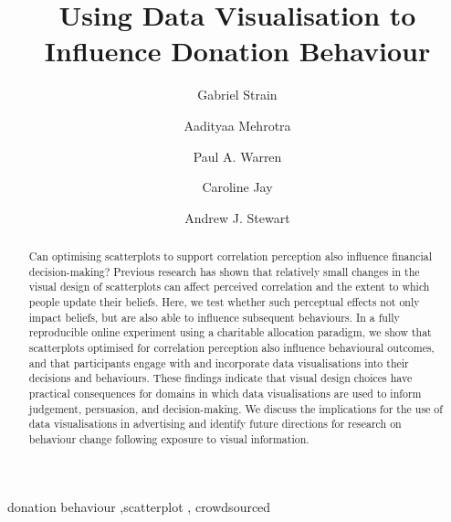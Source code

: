 \documentclass[
  authoryear,
  preprint,
  3p]{elsarticle}
\begin{document}
\begin{frontmatter}
\title{Using Data Visualisation to Influence Donation Behaviour}
\author[1]{Gabriel Strain%
%
}
\author[1]{Aadityaa Mehrotra%
%
}
\author[2]{Paul A. Warren%
%
}
\author[1]{Caroline Jay%
%
}
\author[1]{Andrew J. Stewart%
%
}







        
\begin{abstract}
Can optimising scatterplots to support correlation perception also
influence financial decision-making? Previous research has shown that
relatively small changes in the visual design of scatterplots can affect
perceived correlation and the extent to which people update their
beliefs. Here, we test whether such perceptual effects not only impact
beliefs, but are also able to influence subsequent behaviours. In a
fully reproducible online experiment using a charitable allocation
paradigm, we show that scatterplots optimised for correlation perception
also influence behavioural outcomes, and that participants engage with
and incorporate data visualisations into their decisions and behaviours.
These findings indicate that visual design choices have practical
consequences for domains in which data visualisations are used to inform
judgement, persuasion, and decision-making. We discuss the implications
for the use of data visualisations in advertising and identify future
directions for research on behaviour change following exposure to visual
information.
\end{abstract}





\begin{keyword}
    donation behaviour \sep scatterplot \sep 
    crowdsourced
\end{keyword}
\end{frontmatter}
    
\end{document}
